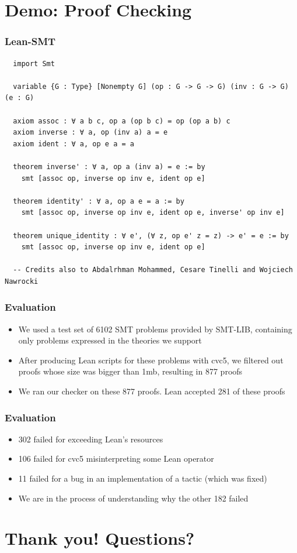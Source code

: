 \documentclass[usepdftitle=false,aspectratio=169,usenames,dvipsnames]{beamer}
\newcommand\vitem{\vfill\item}
\begin{document}



\section{Demo: Proof Checking}

\begin{frame}[fragile]
  \frametitle{Lean-SMT}
  \begin{verbatim}
  import Smt

  variable {G : Type} [Nonempty G] (op : G -> G -> G) (inv : G -> G) (e : G)

  axiom assoc : ∀ a b c, op a (op b c) = op (op a b) c
  axiom inverse : ∀ a, op (inv a) a = e
  axiom ident : ∀ a, op e a = a

  theorem inverse' : ∀ a, op a (inv a) = e := by
    smt [assoc op, inverse op inv e, ident op e]

  theorem identity' : ∀ a, op a e = a := by
    smt [assoc op, inverse op inv e, ident op e, inverse' op inv e]

  theorem unique_identity : ∀ e', (∀ z, op e' z = z) -> e' = e := by
    smt [assoc op, inverse op inv e, ident op e]

  -- Credits also to Abdalrhman Mohammed, Cesare Tinelli and Wojciech Nawrocki
  \end{verbatim}
\end{frame}

\begin{frame}
  \frametitle{Evaluation}
  \begin{itemize}
    \item We used a test set of 6102 SMT problems provided by SMT-LIB, containing only problems expressed in the theories we support
    \vitem After producing Lean scripts for these problems with cvc5, we filtered out proofs whose size was bigger than 1mb, resulting in 877 proofs
    \vitem We ran our checker on these 877 proofs. Lean accepted 281 of these proofs
  \end{itemize}
\end{frame}

\begin{frame}
  \frametitle{Evaluation}
  \begin{itemize}
    \item 302 failed for exceeding Lean's resources
    \vitem 106 failed for cvc5 misinterpreting some Lean operator
    \vitem 11 failed for a bug in an implementation of a tactic (which was fixed)
    \vitem We are in the process of understanding why the other 182 failed
  \end{itemize}
\end{frame}

\section{Thank you! Questions?}


\end{document}
